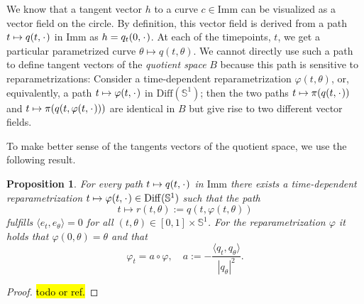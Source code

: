 \documentclass[a4,danish]{article}
\theoremstyle{break}
\newtheorem{proposition}[subsection]{Proposition}
\theoremstyle{definition}
\theoremstyle{Break}
\newcommand{\I}{\text{Imm}}
\renewcommand{\S}{\mathbb{S}}
\newcommand{\blank}{\makebox[1ex]{\textbf{$\cdot$}}}
\renewcommand{\phi}{\varphi}
\begin{document}
We know that a tangent vector $h$ to a curve $c \in \I$ can be visualized
as a vector field on the circle. By definition, this vector field is
derived from a path $t \mapsto q(t,\blank)$ in $\I$ as $h =q_t(0,\blank)$.
At each of the
timepoints, $t$, we get a particular parametrized curve $\theta
\mapsto q(t,\theta)$. We cannot directly use such a path to define
tangent vectors of the \textit{quotient space} $B$ because this path is
sensitive to reparametrizations: Consider a time-dependent
reparametrization $\phi(t,\theta)$, or, equivalently, a path $t \mapsto \phi(t,
\blank)$ in $\text{Diff}(\S^1)$; then the two paths $t \mapsto
\pi(q(t, \blank))$ and $t \mapsto \pi(q(t, \phi(t, \blank)))$ are
identical in $B$ but give rise to two different vector fields.

To make better sense of the tangents vectors of the quotient space, we
use the following result.

\begin{proposition}
  \label{prop:horizontal-path}
  For every path $t \mapsto q(t, \blank)$ in $\mathrm{Imm}$ there exists a
  time-dependent reparametrization $t \mapsto \phi(t, \blank) \in
  \mathrm{Diff}(\S^{1})$ such that the path
  \begin{equation*}
    t \mapsto r(t, \theta):=q(t, \phi(t,\theta))
  \end{equation*}
  fulfills
  $\langle e_t, e_{\theta}\rangle=0$ for all $(t,\theta) \in [0,1]\times \S^1$. For
  the reparametrization $\phi$ it holds that $\phi(0, \theta)=\theta$ and that
  \begin{equation}
    \label{eq:canon-repar}
    \phi_t = a \circ \phi, \quad a := -\frac{\langle q_t,
      q_{\theta}\rangle}{|q_{\theta}|^2}.
  \end{equation}
\end{proposition}

\begin{proof}
  \hl{todo or ref.}
\end{proof}
\end{document}
